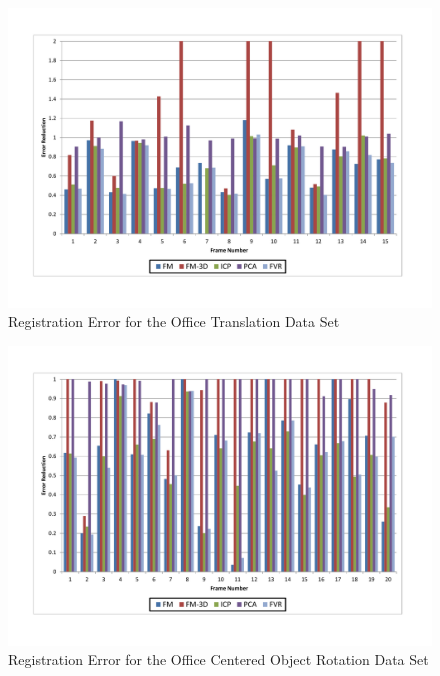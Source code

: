 \begin{figure}[t]
\centering
\includegraphics[width=6.0in]{images/results/Office_TexturedItems_Translation}
\caption{Registration Error for the Office Translation Data Set}
\label{fig:PET8}
\end{figure}

\begin{figure}[t]
\centering
\includegraphics[width=6.0in]{images/results/Office_Texture_blind_spot_rotation}
\caption{Registration Error for the Office Centered Object Rotation Data Set}
\label{fig:PET9}
\end{figure}

